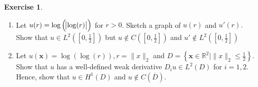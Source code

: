 \documentclass{amsart}
\theoremstyle{plain}
\theoremstyle{definition}
\newtheorem{exer}{Exercise}[section]
\newcommand{\R}{\mathbb{R}}
\begin{document}
\begin{exer}
    \begin{enumerate}[label=\alph*.]
        \item Let $u(r) = \log\left(\abs{\log(r)}\right)$ for $r> 0$. Sketch a graph of $u(r)$ and $u'(r).$ Show that $u\in L^2\left(\left[0,\frac{1}{2}\right]\right)$ but $u\not \in C\left(\left[0,\frac{1}{2}\right]\right)$ and $u' \not \in L^2\left(\left[0,\frac{1}{2}\right]\right)$
        \item Let $u(\mathbf{x}) = \log\left(\log(r)\right), r=\|x\|_{2}$ and $D = \left\{\mathbf{x} \in \R^2 \vert \|x\|_{2} \leq \frac{1}{2}\right\}.$ Show that $u$ has a well-defined weak derivative $D_i u \in L^2(D)$ for $i=1,2.$ Hence, show that $u\in H^1(D)$ and $u\not \in C\left(\overline{D}\right).$
    \end{enumerate}
\end{exer}
\end{document}
